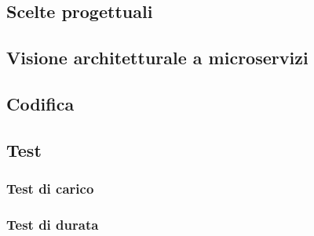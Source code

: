\subsection{Scelte progettuali}

\subsection{Visione architetturale a microservizi}

\subsection{Codifica}

\subsection{Test}

\subsubsection{Test di carico}
\subsubsection{Test di durata}



